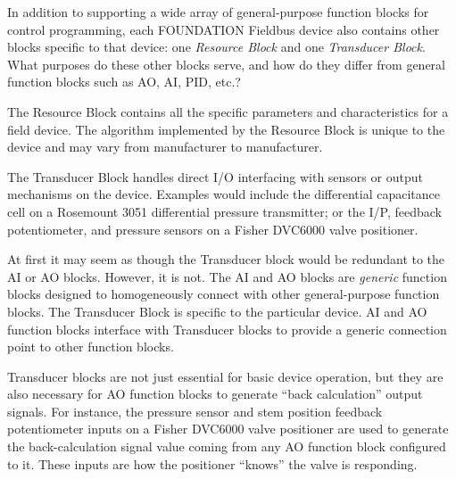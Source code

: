 

In addition to supporting a wide array of general-purpose function blocks for control programming, each FOUNDATION Fieldbus device also contains other blocks specific to that device: one {\it Resource Block} and one {\it Transducer Block}.  What purposes do these other blocks serve, and how do they differ from general function blocks such as AO, AI, PID, etc.?







The Resource Block contains all the specific parameters and characteristics for a field device.  The algorithm implemented by the Resource Block is unique to the device and may vary from manufacturer to manufacturer.

\vskip 10pt

The Transducer Block handles direct I/O interfacing with sensors or output mechanisms on the device.  Examples would include the differential capacitance cell on a Rosemount 3051 differential pressure transmitter; or the I/P, feedback potentiometer, and pressure sensors on a Fisher DVC6000 valve positioner.

\vskip 10pt

At first it may seem as though the Transducer block would be redundant to the AI or AO blocks.  However, it is not.  The AI and AO blocks are {\it generic} function blocks designed to homogeneously connect with other general-purpose function blocks.  The Transducer Block is specific to the particular device.  AI and AO function blocks interface with Transducer blocks to provide a generic connection point to other function blocks.

Transducer blocks are not just essential for basic device operation, but they are also necessary for AO function blocks to generate ``back calculation'' output signals.  For instance, the pressure sensor and stem position feedback potentiometer inputs on a Fisher DVC6000 valve positioner are used to generate the back-calculation signal value coming from any AO function block configured to it.  These inputs are how the positioner ``knows'' the valve is responding.











